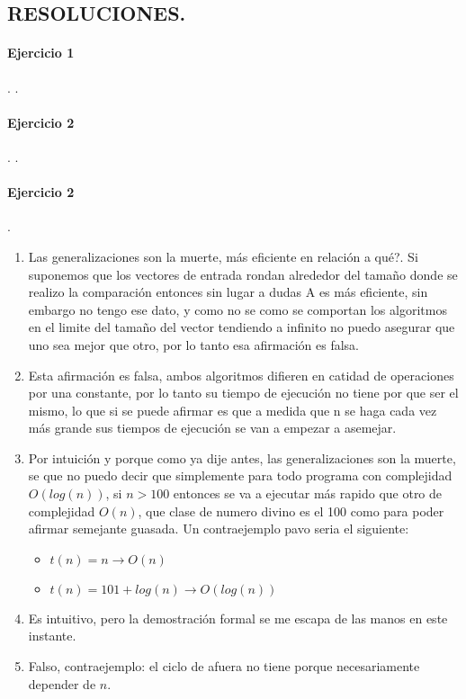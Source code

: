 \documentclass{article}
\begin{document}


\begin{center}
\section*{RESOLUCIONES.}
\end{center}
\paragraph{Ejercicio 1}.
.
\paragraph{Ejercicio 2}.
.
\paragraph{Ejercicio 2}.
\begin{enumerate}[label=\alph*)]
\item  Las generalizaciones son la muerte, más eficiente en relación a qué?.
 Si suponemos que los vectores de entrada rondan alrededor del tamaño donde se realizo la comparación
  entonces sin lugar a dudas A es más eficiente, sin embargo no tengo ese dato, y como no se como se comportan los algoritmos
   en el limite del tamaño del vector tendiendo a infinito no puedo asegurar que uno sea mejor que otro, por lo tanto esa afirmación es falsa.
\item Esta afirmación es falsa, ambos algoritmos difieren en catidad de operaciones por una constante, por lo tanto su tiempo de ejecución no tiene por que ser el mismo, lo que si se puede afirmar es que a medida que n se haga cada vez más grande sus tiempos de ejecución se van a empezar a asemejar.
\item Por intuición y porque como ya dije antes, las generalizaciones son la muerte, se que no puedo decir que simplemente para todo programa con complejidad $O(log(n))$, si $n>100$ entonces se va a ejecutar más rapido que otro de complejidad $O(n)$, que clase de numero divino es el 100 como para poder afirmar semejante guasada. Un contraejemplo pavo seria el siguiente:
\begin{itemize}
\item $t(n)= n \rightarrow O(n)$
\item $t(n)= 101+log(n) \rightarrow O(log(n))$
\end{itemize}
\item Es intuitivo, pero la demostración formal se me escapa de las manos en este instante.
\item Falso, contraejemplo: el ciclo de afuera no tiene porque necesariamente depender de $n$.
\end{enumerate}
\end{document}
